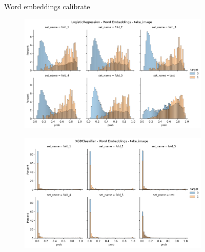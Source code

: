 \begin{figure}
\begin{subfigure}[b]{0.83\textwidth}
    \end{subfigure}
    \caption{Word embeddings calibrate}
\end{figure}

\begin{figure}
    \centering
    \begin{subfigure}[b]{0.83\textwidth}
    \includegraphics[width=\linewidth]{figures/results/word_embeddings/lgr/take_image/lgr__distplot.png}
    \end{subfigure}
    \hfill
    \centering
    \begin{subfigure}[b]{0.83\textwidth}
        \centering
        \includegraphics[width=\linewidth]{figures/results/word_embeddings/xgboost/take_image/take_image__distplot.png}
    \end{subfigure}
    \hfill
    \centering
    \begin{subfigure}[b]{0.83\textwidth}
        \centering

\end{subfigure}
\end{figure}

